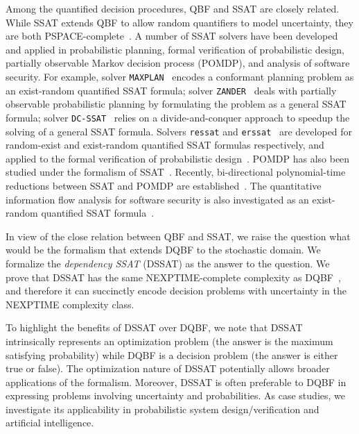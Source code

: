     Among the quantified decision procedures, QBF and SSAT are closely related.
    While SSAT extends QBF to allow random quantifiers to model uncertainty, they are both PSPACE-complete~\cite{Stockmeyer1973}.
    A number of SSAT solvers have been developed and applied in probabilistic planning, formal verification of probabilistic design, partially observable Markov decision process (POMDP), and analysis of software security.
    For example, solver \texttt{MAXPLAN}~\cite{Majercik1998} encodes a conformant planning problem as an exist-random quantified SSAT formula; solver \texttt{ZANDER}~\cite{Majercik2003} deals with partially observable probabilistic planning by formulating the problem as a general SSAT formula; solver \texttt{DC-SSAT}~\cite{Majercik2005} relies on a divide-and-conquer approach to speedup the solving of a general SSAT formula.
    Solvers \texttt{ressat} and \texttt{erssat}~\cite{LeeIJCAI17RESSAT,LeeIJCAI18ERSSAT} are developed for random-exist and exist-random quantified SSAT formulas respectively, and applied to the formal verification of probabilistic design~\cite{LeeTC18ProbDesign}.
    POMDP has also been studied under the formalism of SSAT~\cite{Majercik2004,Salmon2020}.
    Recently, bi-directional polynomial-time reductions between SSAT and POMDP are established~\cite{Salmon2020}.
    The quantitative information flow analysis for software security is also investigated as an exist-random quantified SSAT formula~\cite{Fremont2017}.

    In view of the close relation between QBF and SSAT, we raise the question what would be the formalism that extends DQBF to the stochastic domain.
    We formalize the \emph{dependency SSAT} (DSSAT) as the answer to the question.
    We prove that DSSAT has the same NEXPTIME-complete complexity as DQBF~\cite{Peterson2001}, and therefore it can succinctly encode decision problems with uncertainty in the NEXPTIME complexity class.

    To highlight the benefits of DSSAT over DQBF, we note that DSSAT intrinsically represents an optimization problem (the answer is the maximum satisfying probability) while DQBF is a decision problem (the answer is either true or false).
    The optimization nature of DSSAT potentially allows broader applications of the formalism.
    Moreover, DSSAT is often preferable to DQBF in expressing problems involving uncertainty and probabilities.
    As case studies, we investigate its applicability in probabilistic system design/verification and artificial intelligence.

